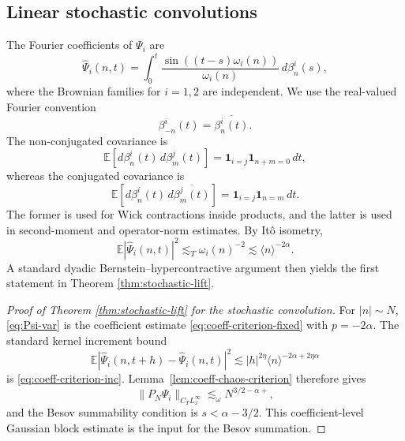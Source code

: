 \documentclass[10pt]{amsart}
\numberwithin{equation}{section}
\theoremstyle{plain}
\theoremstyle{definition}
\theoremstyle{remark}
\newcommand{\E}{\mathbb{E}}
\begin{document}
\subsection{Linear stochastic convolutions}
The Fourier coefficients of $\Psi_i$ are
\begin{equation}\label{eq:Psi-fourier}
\widehat\Psi_i(n,t)=\int_0^t \frac{\sin((t-s)\omega_i(n))}{\omega_i(n)}\,d\beta_n^i(s),
\end{equation}
where the Brownian families for $i=1,2$ are independent.  We use the real-valued Fourier convention
\[
        \beta_{-n}^i(t)=\overline{\beta_n^i(t)}.
\]
The non-conjugated covariance is
\[
        \E[d\beta_n^i(t)\,d\beta_m^j(t)]
        =\mathbf 1_{i=j}\mathbf 1_{n+m=0}\,dt,
\]
whereas the conjugated covariance is
\[
        \E[d\beta_n^i(t)\,d\overline{\beta_m^j(t)}]
        =\mathbf 1_{i=j}\mathbf 1_{n=m}\,dt.
\]
The former is used for Wick contractions inside products, and the latter is used in second-moment and operator-norm estimates.  By It\^o isometry,
\begin{equation}\label{eq:Psi-var}
\E|\widehat\Psi_i(n,t)|^2
\lesssim_T \omega_i(n)^{-2}
\lesssim \langle n\rangle^{-2\alpha}.
\end{equation}
A standard dyadic Bernstein--hypercontractive argument then yields the first statement in Theorem \ref{thm:stochastic-lift}.

\begin{proof}[Proof of Theorem \ref{thm:stochastic-lift} for the stochastic convolution]
For $|n|\sim N$, \eqref{eq:Psi-var} is the coefficient estimate \eqref{eq:coeff-criterion-fixed} with $p=-2\alpha$.  The standard kernel increment bound
\begin{equation*}
\E|\widehat\Psi_i(n,t+h)-\widehat\Psi_i(n,t)|^2\lesssim |h|^{2\eta}\langle n\rangle^{-2\alpha+2\eta\alpha}
\end{equation*}
is \eqref{eq:coeff-criterion-inc}.  Lemma~\ref{lem:coeff-chaos-criterion} therefore gives
\begin{equation*}
 \|P_N\Psi_i\|_{C_TL^\infty_x}\lesssim_\omega N^{3/2-\alpha+},
\end{equation*}
and the Besov summability condition is $s<\alpha-3/2$.  This coefficient-level Gaussian block estimate is the input for the Besov summation.
\end{proof}
\end{document}
